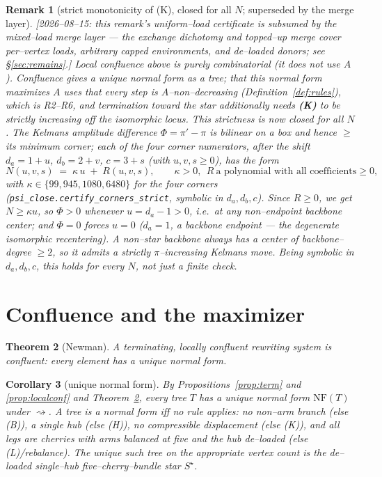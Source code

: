\documentclass[11pt]{article}
\newtheorem{theorem}{Theorem}
\newtheorem{corollary}[theorem]{Corollary}
\newtheorem{remark}[theorem]{Remark}
\newcommand{\Norm}{\mathrm{NF}}
\begin{document}
\begin{remark}[strict monotonicity of (K), closed for all $N$; superseded by the merge layer]\label{rem:import}
[2026--08--15: this remark's uniform--load certificate is subsumed by the mixed--load merge layer
--- the exchange dichotomy and topped--up merge cover per--vertex loads, arbitrary capped
environments, and de--loaded donors; see \S\ref{sec:remains}.]
Local confluence above is purely combinatorial (it does not use $A$). Confluence gives a unique normal form as
a \emph{tree}; that this normal form \emph{maximizes} $A$ uses that every step is $A$--non--decreasing
(Definition~\ref{def:rules}), which is R2--R6, and \emph{termination toward the star} additionally needs
\textbf{(K)} to be \emph{strictly} increasing off the isomorphic locus. This strictness is now closed for all
$N$. The Kelmans amplitude difference $\Phi=\pi'-\pi$ is bilinear on a box and hence $\ge$ its minimum corner;
each of the four corner numerators, after the shift $d_a=1+u$, $d_b=2+v$, $c=3+s$ (with $u,v,s\ge0$), has the
form
\[
  N(u,v,s)\;=\;\kappa\,u\;+\;R(u,v,s),\qquad \kappa>0,\ \ R\ \text{a polynomial with all coefficients}\ge0,
\]
with $\kappa\in\{99,945,1080,6480\}$ for the four corners (\texttt{psi\_close.certify\_corners\_strict},
symbolic in $d_a,d_b,c$). Since $R\ge0$, we get $N\ge\kappa u$, so $\Phi>0$ whenever $u=d_a-1>0$, i.e.\ at any
non--endpoint backbone center; and $\Phi=0$ forces $u=0$ ($d_a=1$, a backbone endpoint --- the degenerate
isomorphic recentering). A non--star backbone always has a center of backbone--degree $\ge2$, so it admits a
strictly $\pi$--increasing Kelmans move. Being symbolic in $d_a,d_b,c$, this holds for \emph{every} $N$, not
just a finite check.
\end{remark}

\section{Confluence and the maximizer}

\begin{theorem}[Newman]\label{thm:newman}
A terminating, locally confluent rewriting system is confluent: every element has a unique normal form.
\end{theorem}

\begin{corollary}[unique normal form]\label{cor:nf}
By Propositions~\ref{prop:term} and \ref{prop:localconf} and Theorem~\ref{thm:newman}, every tree $T$ has a
unique normal form $\Norm(T)$ under $\rightsquigarrow$. A tree is a normal form iff no rule applies: no
non--arm branch (else (B)), a single hub (else (H)), no compressible displacement (else (K)), and all legs are
cherries with arms balanced at five and the hub de--loaded (else (L)/rebalance). The unique such tree on the
appropriate vertex count is the de--loaded single--hub five--cherry--bundle star $S^\star$.
\end{corollary}
\end{document}
